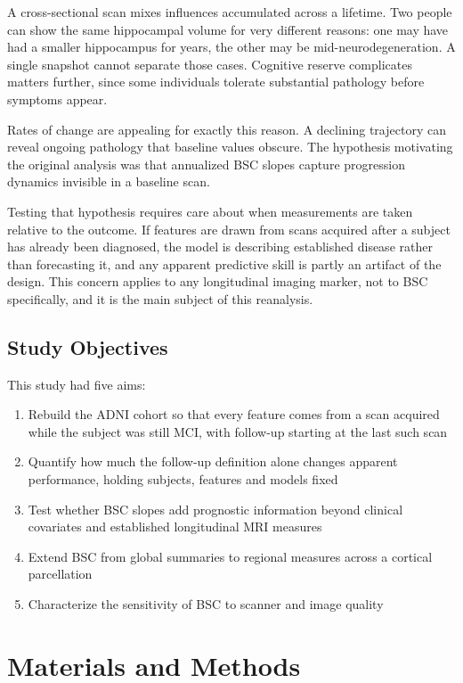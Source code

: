 \documentclass[blue]{ludusofficial}  %
\begin{document}
A cross-sectional scan mixes influences accumulated across a lifetime. Two people can show the same hippocampal volume for very different reasons: one may have had a smaller hippocampus for years, the other may be mid-neurodegeneration. A single snapshot cannot separate those cases. Cognitive reserve complicates matters further, since some individuals tolerate substantial pathology before symptoms appear.

Rates of change are appealing for exactly this reason. A declining trajectory can reveal ongoing pathology that baseline values obscure. The hypothesis motivating the original analysis was that annualized BSC slopes capture progression dynamics invisible in a baseline scan.

Testing that hypothesis requires care about when measurements are taken relative to the outcome. If features are drawn from scans acquired after a subject has already been diagnosed, the model is describing established disease rather than forecasting it, and any apparent predictive skill is partly an artifact of the design. This concern applies to any longitudinal imaging marker, not to BSC specifically, and it is the main subject of this reanalysis.

\subsection{Study Objectives}

This study had five aims:

\begin{enumerate}
    \item Rebuild the ADNI cohort so that every feature comes from a scan acquired while the subject was still MCI, with follow-up starting at the last such scan
    \item Quantify how much the follow-up definition alone changes apparent performance, holding subjects, features and models fixed
    \item Test whether BSC slopes add prognostic information beyond clinical covariates and established longitudinal MRI measures
    \item Extend BSC from global summaries to regional measures across a cortical parcellation
    \item Characterize the sensitivity of BSC to scanner and image quality
\end{enumerate}

\section{Materials and Methods}
\end{document}
